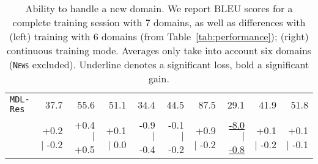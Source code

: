 \documentclass[11pt,a4paper]{article}
\newcommand{\fyDone}[1]{\done[FY]\Todo[FY:]{\textcolor{orange}{#1}}}
\newcommand{\revision}[1]{#1}
\newcommand{\domain}[1]{\texttt{\textsc{#1}}}
\newcommand{\system}[1]{\texttt{{#1}}}
\newcommand{\SW}[1]{\underline{#1}}
\newcommand{\sbcl}[2]{{\scriptsize #1 \hfill $|$ \hfill  #2}}
\begin{document}
\begin{table*}
\begin{tabular}{|p{1.6cm}|*{9}{r|}}
    \footnotesize \system{MDL-Res}    &37.7   & 55.6   & 51.1   & 34.4  & 44.5  & 87.5  & 29.1 & 41.9 & 51.8 \\[-2pt]
                        &  \sbcl{+0.2}{-0.2} & \sbcl{+0.4}{+0.5} & \sbcl{+0.1}{0.0} & \sbcl{-0.9}{-0.4}  & \sbcl{-0.1}{-0.2} &  \sbcl{+0.9}{-0.2} & \sbcl{\SW{-8.0}}{\SW{-0.8}} & \sbcl{+0.1}{-0.2} & \sbcl{+0.1}{-0.1} \\
     \hline
  \end{tabular}
  \caption{Ability to handle a new domain. \revision{We report BLEU scores for a complete training session with 7 domains, as well as differences with (left) training with 6 domains (from Table~\ref{tab:performance}); (right) continuous training mode.} Averages only take into account six domains (\domain{News} excluded). Underline denotes a significant loss, bold a significant gain.}
  \label{tab:warmrestart}
  \fyDone{Fill the table, significancy testing against initial learning condition, for each domain, and averages ? }
  \fyDone{Need correct number / differences for Mixed-Nat}
  \fyDone{averages include one more domain ? No for comparison}
  \fyDone{i used smaller number for differences (easier to read...)}
\end{table*}
\end{document}
